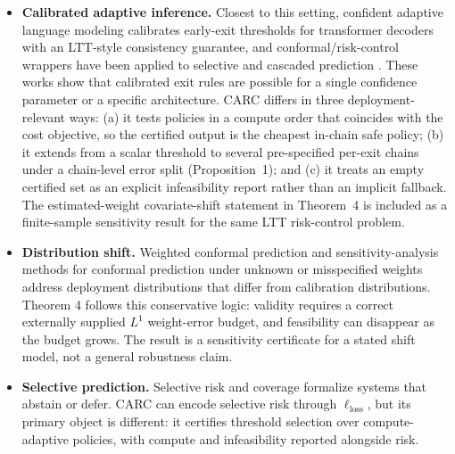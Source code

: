 \documentclass{ieeeaccess}
\begin{document}
\begin{itemize}
\item \textbf{Calibrated adaptive inference.} Closest to this setting, confident adaptive language modeling \cite{schuster2022confident} calibrates early-exit thresholds for transformer decoders with an LTT-style consistency guarantee, and conformal/risk-control wrappers have been applied to selective and cascaded prediction \cite{angelopoulos2024conformal,chen2023frugalgpt}. These works show that calibrated exit rules are possible for a single confidence parameter or a specific architecture. CARC differs in three deployment-relevant ways: (a) it tests policies in a compute order that coincides with the cost objective, so the certified output is the cheapest in-chain safe policy; (b) it extends from a scalar threshold to several pre-specified per-exit chains under a chain-level error split (Proposition~1); and (c) it treats an empty certified set as an explicit infeasibility report rather than an implicit fallback. The estimated-weight covariate-shift statement in Theorem~4 is included as a finite-sample sensitivity result for the same LTT risk-control problem.
\item \textbf{Distribution shift.} Weighted conformal prediction \cite{tibshirani2020conformal} and sensitivity-analysis methods for conformal prediction under unknown or misspecified weights \cite{jin2023sensitivity} address deployment distributions that differ from calibration distributions. Theorem 4 follows this conservative logic: validity requires a correct externally supplied $L^1$ weight-error budget, and feasibility can disappear as the budget grows. The result is a sensitivity certificate for a stated shift model, not a general robustness claim.
\item \textbf{Selective prediction.} Selective risk and coverage \cite{geifman2017selective} formalize systems that abstain or defer. CARC can encode selective risk through $\ell_{\mathrm{loss}}$, but its primary object is different: it certifies threshold selection over compute-adaptive policies, with compute and infeasibility reported alongside risk.
\end{itemize}
\end{document}
